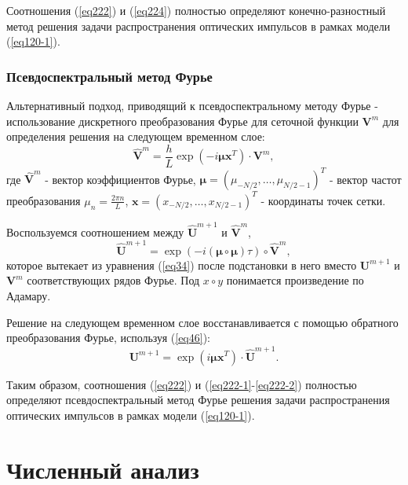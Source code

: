 \documentclass[14pt,a4paper]{extreport}
\begin{document}
				Соотношения (\ref{eq222}) и (\ref{eq224}) полностью определяют конечно-разностный метод решения задачи распространения оптических импульсов в рамках модели (\ref{eq120-1}).

			\subsubsection{Псевдоспектральный метод Фурье}\label{ch222}
				Альтернативный подход, приводящий к псевдоспектральному методу Фурье - использование дискретного преобразования Фурье для сеточной функции \(\boldsymbol{V}^m\) для определения решения на следующем временном слое:
				\begin{equation} \label{eq222-1}
					\hat{\boldsymbol{V}}^m=\frac{h}{L}\exp\left(-i \boldsymbol{\mu} \boldsymbol{x}^{T}\right)\cdot \boldsymbol{V}^{m},
				\end{equation}
				где \(\hat{\boldsymbol{V}}^m\) - вектор коэффициентов Фурье, \(\boldsymbol{\mu}=\left(\mu_{-N/2},\ldots,\mu_{N/2-1}\right)^{T}\) - вектор частот преобразования \(\mu_{n}=\frac{2\pi n}{L}\), \(\boldsymbol{x}=\left(x_{-N/2},\ldots,x_{N/2-1}\right)^{T}\) - координаты точек сетки.

				Воспользуемся соотношением между \(\hat{\boldsymbol{U}}^{m+1}\) и \(\hat{\boldsymbol{V}}^{m}\),
				\begin{equation} \label{eq46}
					\hat{\boldsymbol{U}}^{m+1}=\exp\left(-i \left(\boldsymbol{\mu}\circ \boldsymbol{\mu}\right) \tau\right)\circ \hat{\boldsymbol{V}}^{m},
				\end{equation}
				которое вытекает из уравнения (\ref{eq34}) после подстановки в него вместо \(\boldsymbol{U}^{m+1}\) и \(\boldsymbol{V}^{m}\) соответствующих рядов Фурье. Под \(x\circ y\) понимается произведение по Адамару.

				Решение на следующем временном слое восстанавливается с помощью обратного преобразования Фурье, используя (\ref{eq46}):
				\begin{equation} \label{eq222-2}
					\boldsymbol{U}^{m+1}=\exp\left(i \boldsymbol{\mu} \boldsymbol{x}^{T}\right)\cdot \hat{\boldsymbol{U}}^{m+1}.
				\end{equation}

				Таким образом, соотношения (\ref{eq222}) и (\ref{eq222-1}-\ref{eq222-2}) полностью определяют псевдоспектральный метод Фурье решения задачи распространения оптических импульсов в рамках модели (\ref{eq120-1}).
	\section{Численный анализ}\label{ch300}
\end{document}
